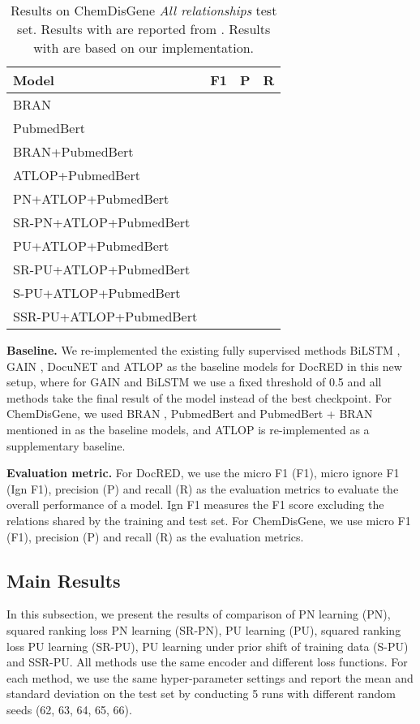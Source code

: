 \documentclass[11pt]{article}
\begin{document}
\begin{table*}
\centering
\begin{tabular}{lccc}
\hline \textbf{Model} & \textbf{F1} & \textbf{P} & \textbf{R} \\
\hline BRAN &  &  &  \\
PubmedBert &  &  &  \\
BRAN+PubmedBert &  &  &  \\
\hline
\hline ATLOP+PubmedBert &  &  &  \\
PN+ATLOP+PubmedBert &  &  &  \\
SR-PN+ATLOP+PubmedBert &  &  &  \\
PU+ATLOP+PubmedBert &  &  &  \\
SR-PU+ATLOP+PubmedBert &  &  &  \\
S-PU+ATLOP+PubmedBert &  &  &  \\
SSR-PU+ATLOP+PubmedBert &  &  &  \\
\hline
\end{tabular}
\caption{\label{table4}
Results on ChemDisGene \emph{All relationships} test set. Results with  are reported from \citep{zhang-etal-2022-distant}. Results with  are based on our implementation.
}
\end{table*}

\textbf{Baseline.} \enspace We re-implemented the existing fully supervised methods BiLSTM \citep{yao-etal-2019-docred}, GAIN \citep{zeng-etal-2020-double}, DocuNET \citep{ijcai2021p551} and ATLOP \citep{Zhou_Huang_Ma_Huang_2021} as the baseline models for DocRED in this new setup, where for GAIN and BiLSTM we use a fixed threshold of 0.5 and all methods take the final result of the model instead of the best checkpoint. For ChemDisGene, we used BRAN \citep{verga-etal-2018-simultaneously}, PubmedBert \citep{10.1145/3458754} and PubmedBert + BRAN mentioned in \citep{ zhang-etal-2022-distant} as the baseline models, and ATLOP is re-implemented as a supplementary baseline.

\textbf{Evaluation metric.} \enspace For DocRED, we use the micro F1 (F1), micro ignore F1 (Ign F1), precision (P) and recall (R) as the evaluation metrics to evaluate the overall performance of a model. Ign F1 measures the F1 score excluding the relations shared by the training and test set. \enspace For ChemDisGene, we use  micro F1 (F1), precision (P) and recall (R) as the evaluation metrics.

\subsection{Main Results}
In this subsection, we present the results of comparison of PN learning (PN), squared ranking loss PN learning (SR-PN), PU learning (PU), squared ranking loss PU learning (SR-PU), PU learning under prior shift of training data (S-PU) and SSR-PU. All methods use the same encoder and different loss functions. For each method, we use the same hyper-parameter settings and report the mean and standard deviation on the test set by conducting 5 runs with different random seeds (62, 63, 64, 65, 66).
\end{document}
